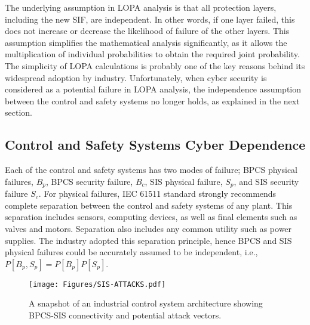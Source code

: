\documentclass[journal]{IEEEtran}
\begin{document}
The underlying assumption in LOPA analysis is that all protection layers, including the new SIF, are independent. In other words, if one layer failed, this does not increase or decrease the likelihood of failure of the other layers. This assumption simplifies the mathematical analysis significantly, as it allows the multiplication of individual probabilities to obtain the required joint probability. The simplicity of LOPA calculations is probably one of the key reasons behind its widespread adoption by industry. Unfortunately, when cyber security is considered as a potential failure in LOPA analysis, the independence assumption between the control and safety systems no longer holds, as explained in the next section.

\subsection{Control and Safety Systems Cyber Dependence} \label{sec:BPCS-SIS-DEPENDENCE}
Each of the control and safety systems has two modes of failure; BPCS physical failures, $B_p$, BPCS security failure, $B_c$, SIS physical failure, $S_p$, and SIS security failure $S_c$. For physical failures, IEC 61511 standard strongly recommends complete separation between the control and safety systems of any plant. This separation includes sensors, computing devices, as well as final elements such as valves and motors. Separation also includes any common utility such as power supplies. The industry adopted this separation principle, hence BPCS and SIS physical failures could be accurately assumed to be independent, i.e., $P[B_p,S_p]=P[B_p]P[S_p]$.

\begin{figure}[]
	\centering
	\texttt{[image: Figures/SIS-ATTACKS.pdf]}
	\caption{A snapshot of an industrial control system architecture showing BPCS-SIS connectivity and potential attack vectors.}
	\label{fig:BPCS-SIS-LINK}
\end{figure}
\end{document}
